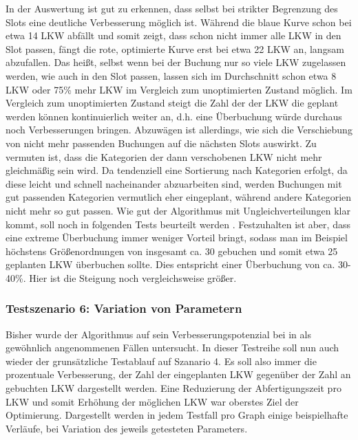 In der Auswertung ist gut zu erkennen, dass selbst bei strikter Begrenzung des Slots eine deutliche Verbesserung möglich ist. Während die blaue Kurve schon bei etwa 14 LKW abfällt und somit zeigt, dass schon nicht immer alle LKW in den Slot passen, fängt die rote, optimierte Kurve erst bei etwa 22 LKW an, langsam abzufallen. Das heißt, selbst wenn bei der Buchung nur so viele LKW zugelassen werden, wie auch in den Slot passen, lassen sich im Durchschnitt schon etwa 8 LKW oder 75\% mehr LKW im Vergleich zum unoptimierten Zustand möglich. Im Vergleich zum unoptimierten Zustand steigt die Zahl der der LKW die geplant werden können kontinuierlich weiter an, d.h. eine Überbuchung würde durchaus noch Verbesserungen bringen. Abzuwägen ist allerdings, wie sich die Verschiebung von nicht mehr passenden Buchungen auf die nächsten Slots auswirkt. Zu vermuten ist, dass die Kategorien der dann verschobenen LKW nicht mehr gleichmäßig sein wird. Da tendenziell eine Sortierung nach Kategorien erfolgt, da diese leicht und schnell nacheinander abzuarbeiten sind, werden Buchungen mit gut passenden Kategorien vermutlich eher eingeplant, während andere Kategorien nicht mehr so gut passen. Wie gut der Algorithmus mit Ungleichverteilungen klar kommt, soll noch in folgenden Tests beurteilt werden . Festzuhalten ist aber, dass eine extreme Überbuchung immer weniger Vorteil bringt, sodass man im Beispiel höchstens Größenordnungen von insgesamt ca. 30 gebuchen und somit etwa 25 geplanten LKW überbuchen sollte. Dies entspricht einer Überbuchung von ca. 30-40\%. Hier ist die Steigung noch vergleichsweise größer.


\subsubsection{Testszenario 6: Variation von Parametern}


Bisher wurde der Algorithmus auf sein Verbesserungspotenzial bei in als gewöhnlich angenommenen Fällen untersucht. In dieser Testreihe soll nun auch wieder der grunsätzliche Testablauf auf Szanario 4. Es soll also immer die prozentuale Verbesserung, der Zahl der eingeplanten LKW gegenüber der Zahl an gebuchten LKW dargestellt werden. Eine Reduzierung der Abfertigungszeit pro LKW und somit Erhöhung der möglichen LKW war oberstes Ziel der Optimierung. Dargestellt werden in jedem Testfall pro Graph einige beispielhafte Verläufe, bei Variation des jeweils getesteten Parameters.

